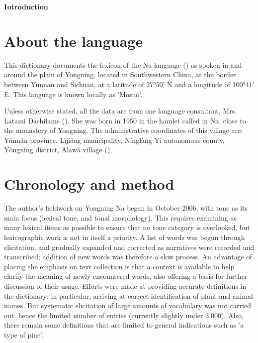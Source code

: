 	{\LARGE \textbf{Introduction}}
	\section{About the language} \label{sec:language}

This dictionary documents the lexicon of the Na language () as spoken in and around the plain of Yongning, located in Southwestern China, at the border between Yunnan and Sichuan, at a latitude of 27°50’ N and a longitude of 100°41’ E. This language is known locally as 'Mosuo'. 

Unless otherwise stated, all the data are from one language consultant, Mrs. Latami Dashilame (). She was born in 1950 in the hamlet called  in Na, close to the monastery of Yongning. The administrative coordinates of this village are: Yúnnán province, Lìjiāng municipality, Nínglàng Yí autonomous county, Yǒngníng district, Ālāwǎ village (). 

	\section{Chronology and method} \label{sec:method}

The author's fieldwork on Yongning Na began in October 2006, with tone as its main focus (lexical tone, and tonal morphology). This requires examining as many lexical items as possible to ensure that no tone category is overlooked, but lexicographic work is not in itself a priority. A list of words was begun through elicitation, and gradually expanded and corrected as narratives were recorded and transcribed; addition of new words was therefore a slow process. An advantage of placing the emphasis on text collection is that a context is available to help clarify the meaning of newly encountered words, also offering a basis for further discussion of their usage. Efforts were made at providing accurate definitions in the dictionary; in particular, arriving at correct identification of plant and animal names. But systematic elicitation of large amounts of vocabulary was not carried out, hence the limited number of entries (currently slightly under 3,000). Also, there remain some definitions that are limited to general indications such as 'a type of pine'. 


